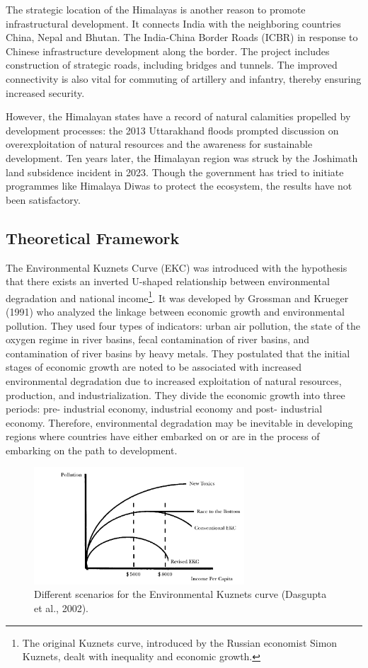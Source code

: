 \documentclass{article}
\begin{document}
The strategic location of the Himalayas is another reason to promote infrastructural development. It connects India with the neighboring countries China, Nepal and Bhutan. The India-China Border Roads (ICBR) in response to Chinese infrastructure development along the border. The project includes construction of strategic roads, including bridges and tunnels. The improved connectivity is also vital for commuting of artillery and infantry, thereby ensuring increased security.

However, the Himalayan states have a record of natural calamities propelled by development processes: the 2013 Uttarakhand floods prompted discussion on overexploitation of natural resources and the awareness for sustainable development. Ten years later, the Himalayan region was struck by the Joshimath land subsidence incident in 2023. Though the government has tried to initiate programmes like Himalaya Diwas to protect the ecosystem, the results have not been satisfactory.

\subsection{Theoretical Framework}

The Environmental Kuznets Curve (EKC) was introduced with the hypothesis that there exists an inverted U-shaped relationship between environmental degradation and national income\footnote[2]{The original Kuznets curve, introduced by the Russian economist Simon Kuznets, dealt with inequality and economic growth.}. It was developed by Grossman and Krueger (1991) who analyzed the linkage between economic growth and environmental pollution. They used four types of indicators: urban air pollution, the state of the oxygen regime in river basins, fecal contamination of river basins, and contamination of river basins by heavy metals. They postulated that the initial stages of economic growth are noted to be associated with increased environmental degradation due to increased exploitation of natural resources, production, and industrialization. They divide the economic growth into three periods: pre- industrial economy, industrial economy and post- industrial economy. Therefore, environmental degradation may be inevitable in developing regions where countries have either embarked on or are in the process of embarking on the path to development.

\begin{figure}[h]
    \centering
    \includegraphics[width=0.7\textwidth]{images/kuznets_scen.png}
    \caption{Different scenarios for the Environmental Kuznets curve (Dasgupta et al., 2002).}
\end{figure}
\end{document}
